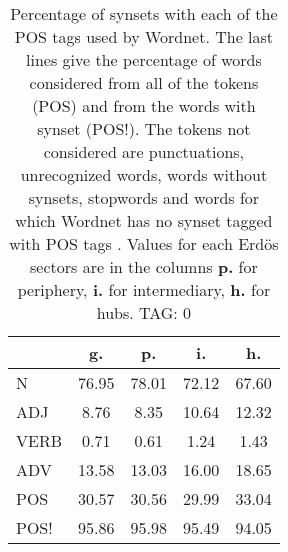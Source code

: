 \begin{table}[h!]
\begin{center}
\begin{tabular}{| l | c | c | c | c |}\hline
 & g. & p. & i. & h. \\\hline
N & 76.95  & 78.01  & 72.12  & 67.60 \\\hline
ADJ & 8.76  & 8.35  & 10.64  & 12.32 \\\hline
VERB & 0.71  & 0.61  & 1.24  & 1.43 \\\hline
ADV & 13.58  & 13.03  & 16.00  & 18.65 \\\hline
POS & 30.57  & 30.56  & 29.99  & 33.04 \\\hline
POS! & 95.86  & 95.98  & 95.49  & 94.05 \\\hline
\end{tabular}
\caption{Percentage of synsets with each of the POS tags used by Wordnet. The last lines give the percentage of words considered from all of the tokens (POS) and from the words with synset (POS!). The tokens not considered are punctuations, unrecognized words, words without synsets, stopwords and words for which Wordnet has no synset  tagged with POS tags . Values for each Erd\"os sectors are in the columns {{\bf p.}} for periphery, {{\bf i.}} for intermediary, {{\bf h.}} for hubs. TAG: 0}
\end{center}
\end{table}